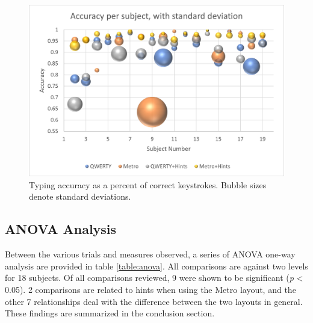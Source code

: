 \documentclass[english]{vgtc}
\begin{document}
\begin{figure}
  \centering
  \includegraphics[width=0.95\columnwidth]{accuracy.png}
  \caption{Typing accuracy as a percent of correct keystrokes. Bubble sizes denote standard deviations.}
  \label{fig:accuracy}
\end{figure}

\subsection{ANOVA Analysis}

Between the various trials and measures observed, a series of ANOVA one-way analysis are provided in table \ref{table:anova}. All comparisons are against two levels for 18 subjects. Of all comparisons reviewed, 9 were shown to be significant (\emph{p} < 0.05). 2 comparisons are related to hints when using the Metro layout, and the other 7 relationships deal with the difference between the two layouts in general.
These findings are summarized in the conclusion section.
\end{document}
